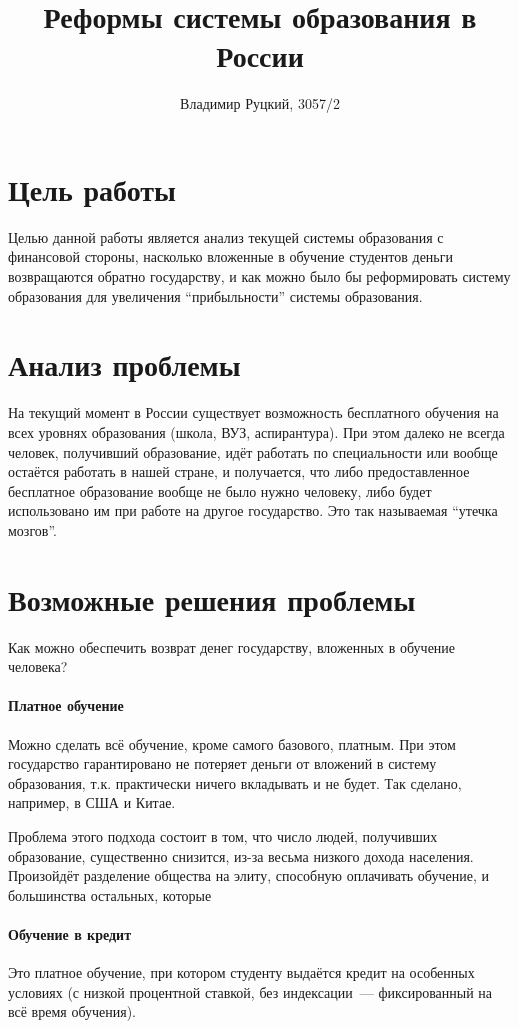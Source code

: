 \documentclass[10pt,a4paper,titlepage]{article}
\title{Реформы системы образования в России}
\author{Владимир Руцкий, 3057/2}
\begin{document}
\titlepage
\maketitle

\section*{Цель работы}
Целью данной работы является анализ текущей системы образования с финансовой стороны, 
насколько вложенные в обучение студентов деньги возвращаются обратно государству, 
и как можно было бы реформировать систему образования для увеличения ``прибыльности'' 
системы образования.

\section*{Анализ проблемы}
На текущий момент в России существует возможность бесплатного обучения на всех уровнях образования 
(школа, ВУЗ, аспирантура).
При этом далеко не всегда человек, получивший образование, 
идёт работать по специальности или вообще остаётся работать в нашей стране, 
и получается, что либо предоставленное бесплатное образование вообще не было нужно человеку, 
либо будет использовано им при работе на другое государство.
Это так называемая ``утечка мозгов''. %

\section*{Возможные решения проблемы}
Как можно обеспечить возврат денег государству, вложенных в обучение человека?

\paragraph{Платное обучение} 
Можно сделать всё обучение, кроме самого базового, платным. 
При этом государство гарантировано не потеряет деньги от вложений в систему образования, 
т.к. практически ничего вкладывать и не будет.
Так сделано, например, в США и Китае.

Проблема этого подхода состоит в том, что число людей, получивших образование, существенно снизится, 
из-за весьма низкого дохода населения.
Произойдёт разделение общества на элиту, способную оплачивать обучение,
и большинства остальных, которые %

\paragraph{Обучение в кредит}
Это платное обучение, при котором студенту выдаётся кредит на особенных условиях
(с низкой процентной ставкой, без индексации~--- фиксированный на всё время обучения).
\end{document}
